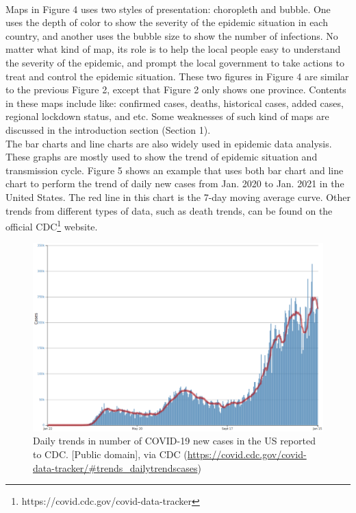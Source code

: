 \documentclass[sigplan,screen]{acmart}
\begin{document}
\\
Maps in Figure 4 uses two styles of presentation: choropleth and bubble.
One uses the depth of color to show the severity of the epidemic situation in each country, and another uses the bubble size to show the number of infections.
No matter what kind of map, its role is to help the local people easy to understand the severity of the epidemic, and prompt the local government to take actions to treat and control the epidemic situation.
These two figures in Figure 4 are similar to the previous Figure 2, except that Figure 2 only shows one province.
Contents in these maps include like: confirmed cases, deaths, historical cases, added cases, regional lockdown status, and etc.
Some weaknesses of such kind of maps are discussed in the introduction section (Section 1).
\\
The bar charts and line charts are also widely used in epidemic data analysis.
These graphs are mostly used to show the trend of epidemic situation and transmission cycle.
Figure 5 shows an example that uses both bar chart and line chart to perform the trend of daily new cases from Jan. 2020 to Jan. 2021 in the United States.
The red line in this chart is the 7-day moving average curve.
Other trends from different types of data, such as death trends, can be found on the official CDC\footnote{https://covid.cdc.gov/covid-data-tracker} website.
\begin{figure}[htb]
	\centering\includegraphics[width=\linewidth]{linebar-us-1-15.png}
	\caption{Daily trends in number of COVID-19 new cases in the US reported to CDC. [Public domain], via CDC (\url{https://covid.cdc.gov/covid-data-tracker/\#trends_dailytrendscases})}
\end{figure}
\end{document}
